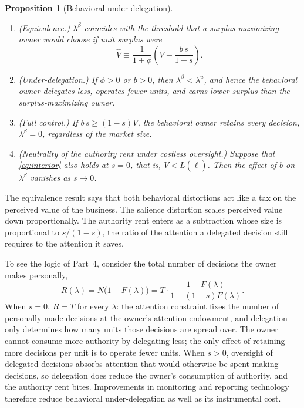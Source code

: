 \documentclass[11pt,a4paper]{article}
\theoremstyle{plain}
\newtheorem{proposition}{Proposition}
\newcommand{\lbar}{\bar{\ell}}
\begin{document}
\begin{proposition}[Behavioral under-delegation]\label{prop:behavioral}
\leavevmode
\begin{enumerate}
  \item (Equivalence.) $\lambda^\beta$ coincides with the threshold that a surplus-maximizing owner would choose if unit surplus were
  \begin{equation}\label{eq:Vhat}
    \hat V \equiv \frac{1}{1 + \phi} \left( V - \frac{b \, s}{1 - s} \right).
  \end{equation}
  \item (Under-delegation.) If $\phi > 0$ or $b > 0$, then $\lambda^\beta < \lambda^u$, and hence the behavioral owner delegates less, operates fewer units, and earns lower surplus than the surplus-maximizing owner.
  \item (Full control.) If $b \, s \ge (1 - s) V$, the behavioral owner retains every decision, $\lambda^\beta = 0$, regardless of the market size.
  \item (Neutrality of the authority rent under costless oversight.) Suppose that \eqref{eq:interior} also holds at $s = 0$, that is, $V < L(\lbar)$. Then the effect of $b$ on $\lambda^\beta$ vanishes as $s \to 0$.
\end{enumerate}
\end{proposition}

The equivalence result says that both behavioral distortions act like a tax on the perceived value of the business. The salience distortion scales perceived value down proportionally. The authority rent enters as a subtraction whose size is proportional to $s/(1-s)$, the ratio of the attention a delegated decision still requires to the attention it saves.

To see the logic of Part~4, consider the total number of decisions the owner makes personally,
\begin{equation}\label{eq:R}
  R(\lambda) = N \big(1 - F(\lambda)\big) = T \cdot \frac{1 - F(\lambda)}{1 - (1 - s) F(\lambda)}.
\end{equation}
When $s = 0$, $R = T$ for every $\lambda$: the attention constraint fixes the number of personally made decisions at the owner's attention endowment, and delegation only determines how many units those decisions are spread over. The owner cannot consume more authority by delegating less; the only effect of retaining more decisions per unit is to operate fewer units. When $s > 0$, oversight of delegated decisions absorbs attention that would otherwise be spent making decisions, so delegation does reduce the owner's consumption of authority, and the authority rent bites. Improvements in monitoring and reporting technology therefore reduce behavioral under-delegation as well as its instrumental cost.
\end{document}
